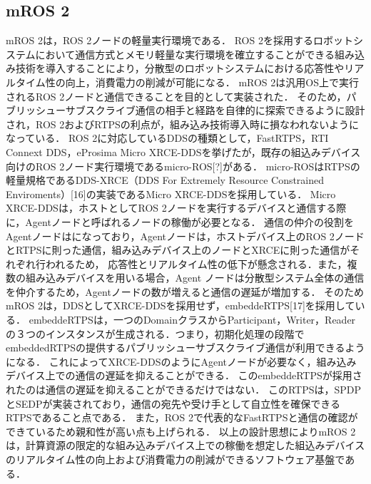 \subsection{mROS 2}
mROS 2は，ROS 2ノードの軽量実行環境である．
ROS 2を採用するロボットシステムにおいて通信方式とメモリ軽量な実行環境を確立することができる組み込み技術を導入することにより，分散型のロボットシステムにおける応答性やリアルタイム性の向上，消費電力の削減が可能になる．
mROS 2は汎用OS上で実行されるROS 2ノードと通信できることを目的として実装された．
そのため，パブリッシューサブスクライブ通信の相手と経路を自律的に探索できるように設計され，ROS 2およびRTPSの利点が，組み込み技術導入時に損なわれないようになっている．
ROS 2に対応しているDDSの種類として，FastRTPS，RTI Connext DDS，eProsima Micro XRCE-DDSを挙げたが，既存の組込みデバイス向けのROS 2ノード実行環境であるmicro-ROS[?]がある．
micro-ROSはRTPSの軽量規格であるDDS-XRCE（DDS For Extremely Resource Constrained Enviroments）[16]の実装であるMicro XRCE-DDSを採用している．
Micro　XRCE-DDSは，ホストとしてROS 2ノードを実行するデバイスと通信する際に，Agentノードと呼ばれるノードの稼働が必要となる．
通信の仲介の役割をAgentノードはになっており，Agentノードは，ホストデバイス上のROS 2ノードとRTPSに則った通信，組み込みデバイス上のノードとXRCEに則った通信がそれぞれ行われるため，
応答性とリアルタイム性の低下が懸念される．また，複数の組み込みデバイスを用いる場合，Agent ノードは分散型システム全体の通信を仲介するため，Agentノードの数が増えると通信の遅延が増加する．
そのためmROS 2は，DDSとしてXRCE-DDSを採用せず，embeddeRTPS[17]を採用している．
embeddeRTPSは，一つのDomainクラスからParticipant，Writer，Readerの３つのインスタンスが生成される．つまり，初期化処理の段階でembeddedRTPSの提供するパブリッシューサブスクライブ通信が利用できるようになる．
これによってXRCE-DDSのようにAgentノードが必要なく，組み込みデバイス上での通信の遅延を抑えることができる．
このembeddeRTPSが採用されたのは通信の遅延を抑えることができるだけではない．
このRTPSは，SPDPとSEDPが実装されており，通信の宛先や受け手として自立性を確保できるRTPSであること点である．
また，ROS 2で代表的なFastRTPSと通信の確認ができているため親和性が高い点も上げられる．
以上の設計思想によりmROS 2は，計算資源の限定的な組み込みデバイス上での稼働を想定した組込みデバイスのリアルタイム性の向上および消費電力の削減ができるソフトウェア基盤である．
